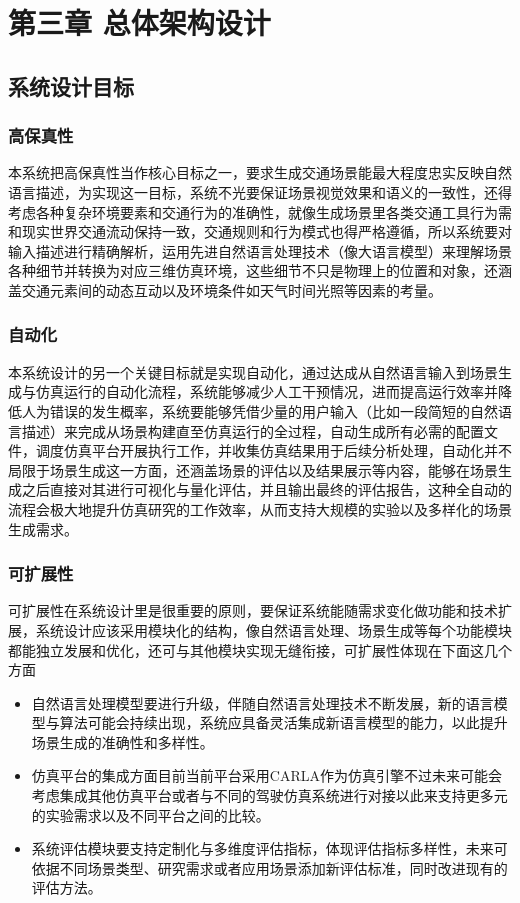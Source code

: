 \chapter{第三章 总体架构设计}
\section{系统设计目标}
\subsection{高保真性}
本系统把高保真性当作核心目标之一，要求生成交通场景能最大程度忠实反映自然语言描述，为实现这一目标，系统不光要保证场景视觉效果和语义的一致性，还得考虑各种复杂环境要素和交通行为的准确性，就像生成场景里各类交通工具行为需和现实世界交通流动保持一致，交通规则和行为模式也得严格遵循，所以系统要对输入描述进行精确解析，运用先进自然语言处理技术（像大语言模型）来理解场景各种细节并转换为对应三维仿真环境，这些细节不只是物理上的位置和对象，还涵盖交通元素间的动态互动以及环境条件如天气时间光照等因素的考量。

\subsection{自动化}
本系统设计的另一个关键目标就是实现自动化，通过达成从自然语言输入到场景生成与仿真运行的自动化流程，系统能够减少人工干预情况，进而提高运行效率并降低人为错误的发生概率，系统要能够凭借少量的用户输入（比如一段简短的自然语言描述）来完成从场景构建直至仿真运行的全过程，自动生成所有必需的配置文件，调度仿真平台开展执行工作，并收集仿真结果用于后续分析处理，自动化并不局限于场景生成这一方面，还涵盖场景的评估以及结果展示等内容，能够在场景生成之后直接对其进行可视化与量化评估，并且输出最终的评估报告，这种全自动的流程会极大地提升仿真研究的工作效率，从而支持大规模的实验以及多样化的场景生成需求。

\subsection{可扩展性}
可扩展性在系统设计里是很重要的原则，要保证系统能随需求变化做功能和技术扩展，系统设计应该采用模块化的结构，像自然语言处理、场景生成等每个功能模块都能独立发展和优化，还可与其他模块实现无缝衔接，可扩展性体现在下面这几个方面
\begin{itemize}
	\item 自然语言处理模型要进行升级，伴随自然语言处理技术不断发展，新的语言模型与算法可能会持续出现，系统应具备灵活集成新语言模型的能力，以此提升场景生成的准确性和多样性。
	\item 仿真平台的集成方面目前当前平台采用CARLA作为仿真引擎不过未来可能会考虑集成其他仿真平台或者与不同的驾驶仿真系统进行对接以此来支持更多元的实验需求以及不同平台之间的比较。
	\item 系统评估模块要支持定制化与多维度评估指标，体现评估指标多样性，未来可依据不同场景类型、研究需求或者应用场景添加新评估标准，同时改进现有的评估方法。
\end{itemize}

